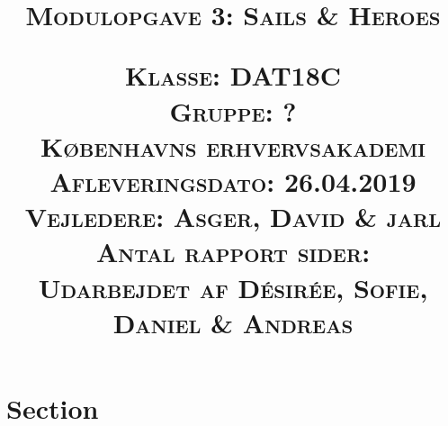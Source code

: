 \documentclass[12pt,a4paper]{report}
\begin{document}
\title{
\date{}
\author{}
\textsc{\Huge{Modulopgave 3: Sails \& Heroes}} \\
\vspace{\fill}
\begin{center}
\end{center}
\vspace{\fill}
{
\begin{flushleft}
\textsc{\large{Klasse: DAT18C}} \\
\textsc{\large{Gruppe: ?}} \\
\textsc{\large{Københavns erhvervsakademi}} \\
\textsc{\large{Afleveringsdato: 26.04.2019}} \\
\textsc{\large{Vejledere: Asger, David \& jarl}} \\
\textsc{\large{Antal rapport sider: \pageref{LastPage}}} \\
\textsc{\large{Udarbejdet af Désirée, Sofie, Daniel \& Andreas}}
\end{flushleft}
}
}
\maketitle

\newpage

{
\tableofcontents\thispagestyle{fancy}
\newpage
}

\section*{Section}
\end{document}
